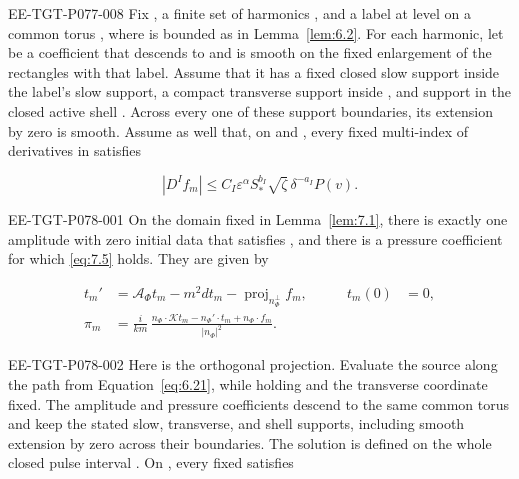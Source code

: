 \begin{proposition}\label{prop:7.2}
\begin{EESegment}{EE-TGT-P077-008}
Fix , a finite set of harmonics , and a label at level  on a common torus , where  is bounded as in Lemma~\ref{lem:6.2}. For each harmonic, let  be a coefficient that descends to  and is smooth on the fixed enlargement of the rectangles with that label. Assume that it has a fixed closed slow support inside the label's slow support, a compact transverse support inside , and support in the closed active shell . Across every one of these support boundaries, its extension by zero is smooth. Assume as well that, on  and , every fixed multi-index  of derivatives in  satisfies
\end{EESegment}
\[
|D^If_m|\leq C_I\varepsilon^\alpha S_*^{b_I}\sqrt{\zeta}\,\delta^{-a_I}P(v).
\]
\begin{EESegment}{EE-TGT-P078-001}
On the domain  fixed in Lemma~\ref{lem:7.1}, there is exactly one amplitude  with zero initial data that satisfies , and there is a pressure coefficient  for which \eqref{eq:7.5} holds. They are given by
\end{EESegment}
\begin{equation}
\begin{aligned}
t_m'&=\mathcal A_\Phi t_m-m^2dt_m-\operatorname{proj}_{n_\Phi^\perp}f_m,
&\qquad t_m(0)&=0,\\
\pi_m&=\frac{i}{km}\,
\frac{n_\Phi\cdot\mathcal Kt_m-n_\Phi'\cdot t_m+n_\Phi\cdot f_m}{|n_\Phi|^2}.
\end{aligned}
\tag{7.13}\label{eq:7.13}
\end{equation}
\begin{EESegment}{EE-TGT-P078-002}
Here  is the orthogonal projection. Evaluate the source along the path  from Equation~\eqref{eq:6.21}, while holding  and the transverse coordinate fixed. The amplitude and pressure coefficients descend to the same common torus and keep the stated slow, transverse, and shell supports, including smooth extension by zero across their boundaries. The solution is defined on the whole closed pulse interval . On , every fixed  satisfies

\end{EESegment}
\end{proposition}
